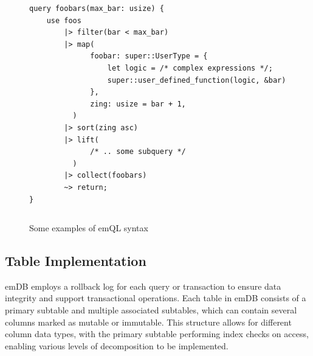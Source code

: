 \documentclass[conference]{IEEEtran}
\begin{document}
\begin{figure}[b]
    \begin{minipage}{.45\textwidth}
        \begin{verbatim}
query foobars(max_bar: usize) {
    use foos
        |> filter(bar < max_bar)
        |> map(
              foobar: super::UserType = {
                  let logic = /* complex expressions */;
                  super::user_defined_function(logic, &bar)
              },
              zing: usize = bar + 1, 
          )
        |> sort(zing asc)
        |> lift(
              /* .. some subquery */
          )
        |> collect(foobars)
        ~> return;
}
        \end{verbatim}
    \end{minipage}
    \begin{minipage}{.45\textwidth}
        \begin{verbatim}

        \end{verbatim}
    \end{minipage}
    \centering
    \caption{Some examples of emQL syntax}
    \label{fig:emql-example}
\end{figure}

\subsection{Table Implementation}




emDB employs a rollback log for each query or transaction to ensure data integrity
and support transactional operations. Each table in emDB consists of a primary
subtable and multiple associated subtables, which can contain several columns marked
as mutable or immutable. This structure allows for different column data types,
with the primary subtable performing index checks on access, enabling various
levels of decomposition to be implemented.
\end{document}
